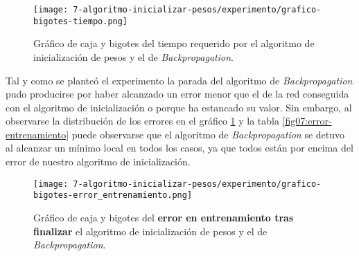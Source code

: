 \begin{figure}[H]
    \centering
     \texttt{[image: 7-algoritmo-inicializar-pesos/experimento/grafico-bigotes-tiempo.png]}
     \caption{Gráfico de caja y bigotes del tiempo requerido por el algoritmo de inicialización de pesos y el de \textit{Backpropagation}.}
\end{figure}
\begin{table}[H]
    \centering
    \caption{Error mínimo cuadrático obtenido en entrenamiento tras acabar la ejecución}
    \label{fig07:error-entrenamiento}
\end{table}

Tal y como se planteó el experimento la parada del algoritmo de \textit{Backpropagation} 
pudo producirse por haber alcanzado un error menor que el de la red conseguida con el 
algoritmo de inicialización o porque ha estancado su valor.
Sin embargo, al observarse la distribución de los errores en el 
gráfico \ref{img07:error-entrenamiento} y la tabla \ref{fig07:error-entrenamiento} puede observarse que 
el algoritmo de \textit{Backpropagation} se detuvo al alcanzar un 
mínimo local en todos los casos, ya que todos están por encima del error de nuestro algoritmo de inicialización. 

\begin{figure}[H]
    \centering
     \texttt{[image: 7-algoritmo-inicializar-pesos/experimento/grafico-bigotes-error\_entrenamiento.png]}
     \caption{Gráfico de caja y bigotes del \textbf{error en entrenamiento tras finalizar } el algoritmo de inicialización de pesos y el de \textit{Backpropagation}.}
     \label{img07:error-entrenamiento}
\end{figure}

